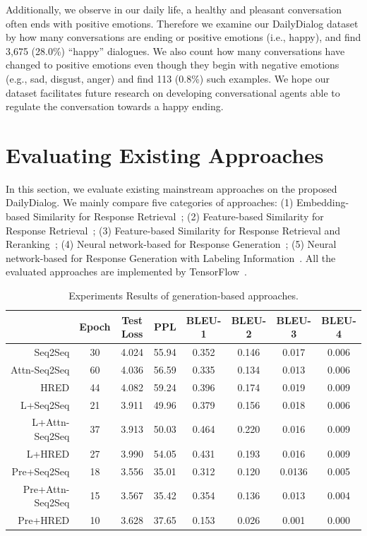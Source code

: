 \documentclass[11pt,letterpaper]{article}
\begin{document}
Additionally, we observe in our daily life, a healthy and pleasant conversation often ends with positive emotions. Therefore we examine our DailyDialog dataset by how many conversations are ending or positive emotions (i.e., happy), and find 3,675 (28.0\%) ``happy'' dialogues. We also count how many conversations have changed to positive emotions even though they begin with negative emotions (e.g., sad, disgust, anger) and find 113 (0.8\%) such examples. We hope our dataset facilitates future research on developing conversational agents able to regulate the conversation towards a happy ending. 


\section{Evaluating Existing Approaches}
\label{sec:eval}
In this section, we evaluate existing mainstream approaches on the proposed DailyDialog. We mainly compare five categories of approaches: (1) Embedding-based Similarity for Response Retrieval~\cite{luocombination}; (2) Feature-based Similarity for Response Retrieval~\cite{jafarpour2010filter}; (3) Feature-based Similarity for Response Retrieval and Reranking~\cite{luocombination,otsuka2017utterance}; (4) Neural network-based for Response Generation~\cite{Shang2015NeuralRM,hred}; (5) Neural network-based for Response Generation with Labeling Information~\cite{ECM}. All the evaluated approaches are implemented by TensorFlow~\cite{tensorflow}.


\begin{table}[h]
\centering
\begin{tabular}{rccccccc}
\toprule
& Epoch & Test Loss & PPL & BLEU-1 & BLEU-2 & BLEU-3 & BLEU-4 \\
\midrule
Seq2Seq & 30 &  4.024 & 55.94 & 0.352 & 0.146 & 0.017 &0.006 \\
Attn-Seq2Seq & 60 & 4.036 & 56.59 &0.335& 0.134& 0.013& 0.006 \\
HRED & 44 & 4.082 & 59.24 &0.396& 0.174& 0.019& 0.009\\%
\hline
L+Seq2Seq & 21 & 3.911 & 49.96&0.379&0.156&0.018&0.006\\
L+Attn-Seq2Seq & 37 & 3.913 & 50.03&0.464& 0.220& 0.016& 0.009\\
L+HRED & 27 & 3.990 & 54.05&0.431& 0.193& 0.016& 0.009\\
\hline
Pre+Seq2Seq & 18 & 3.556 & 35.01&0.312&0.120&0.0136&0.005\\
Pre+Attn-Seq2Seq & 15 & 3.567&35.42&0.354&0.136&0.013&0.004\\
Pre+HRED & 10 &3.628&37.65&0.153& 0.026&0.001&0.000\\
\bottomrule
\end{tabular}
\caption{Experiments Results of generation-based approaches.}
\label{generation_ppl}
\end{table}
\end{document}
